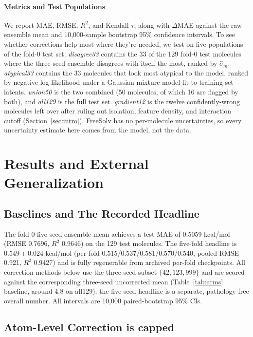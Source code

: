 \documentclass{article}
\begin{document}
\paragraph{Metrics and Test Populations} We report MAE, RMSE, $R^2$, and Kendall $\tau$, along
with $\Delta$MAE against the raw ensemble mean and 10{,}000-sample
bootstrap 95\% confidence intervals. To see whether corrections help most
where they're needed, we test on five populations of the fold-0 test set.
\emph{disagree33} contains the 33 of the 129 fold-0 test molecules where the three-seed
ensemble disagrees with itself the most, ranked by $\hat\sigma_m$.
\emph{atypical33} contains the 33 molecules that look most atypical to the
model, ranked by negative log-likelihood under a Gaussian mixture model
fit to training-set latents. \emph{union50} is the two combined (50 molecules, of which 16 are flagged by both), and
\emph{all129} is the full test set. \emph{gradient12} is the twelve
confidently-wrong molecules left over after ruling out isolation, feature
density, and interaction cutoff (Section~\ref{sec:intro}). FreeSolv has no
per-molecule uncertainties, so every uncertainty estimate here comes from
the model, not the data.



\section{Results and External Generalization}
\label{sec:external}

\subsection{Baselines and The Recorded Headline}

The fold-0 five-seed ensemble mean achieves a test MAE of 0.5059 kcal/mol
(RMSE 0.7696, $R^2$ 0.9646) on the 129 test molecules. The five-fold
headline is $0.549 \pm 0.024$ kcal/mol (per-fold 0.515/0.537/0.581/0.570/0.540;
pooled RMSE 0.921, $R^2$ 0.9427) and is fully regenerable from archived
per-fold checkpoints. All correction methods below use the three-seed subset
$\{42,123,999\}$ and are scored against the corresponding three-seed
uncorrected mean (Table~\ref{tab:arms} baseline, around 4.8 on all129); the
five-seed headline is a separate, pathology-free overall number. All
intervals are 10{,}000 paired-bootstrap 95\% CIs.

\subsection{Atom-Level Correction is capped}
\end{document}
